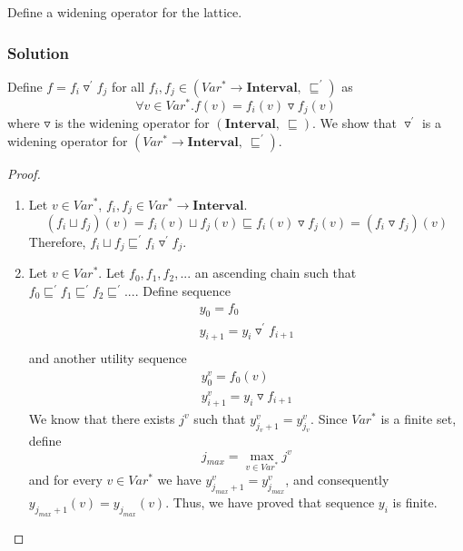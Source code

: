 Define a widening operator for the lattice.

\subsubsection*{Solution}
Define $f=f_i\triangledown^\prime f_j$ for all $f_i,f_j\in (Var^* \rightarrow \mathbf{Interval},\ \sqsubseteq^\prime)$ as
\begin{equation*}
\forall v\in Var^*.f(v)=f_i(v)\triangledown f_j(v)
\end{equation*}
where $\triangledown$ is the widening operator for $(\mathbf{Interval},\ \sqsubseteq)$. We show that $\triangledown^\prime$ is a widening operator for $(Var^* \rightarrow \mathbf{Interval},\ \sqsubseteq^\prime)$.
\begin{proof}
	\begin{enumerate}
	\item Let $v\in Var^*$, $f_i,f_j\in Var^* \rightarrow \mathbf{Interval}$.\\
	\begin{equation*}
	(f_i\sqcup f_j)(v)=f_i(v)\sqcup f_j(v)\sqsubseteq f_i(v)\triangledown f_j(v)=(f_i\triangledown f_j)(v)
	\end{equation*}
	Therefore, $f_i\sqcup f_j\sqsubseteq^\prime f_i\triangledown^\prime f_j$.
	\item Let $v\in Var^*$. Let $f_0,f_1,f_2,...$ an ascending chain such that $f_0\sqsubseteq^\prime f_1\sqsubseteq^\prime f_2\sqsubseteq^\prime...$. Define sequence
	\begin{align*}
	y_0=f_0 \\
	y_{i+1}=y_i\triangledown^\prime f_{i+1}\\
	\end{align*}
	and another utility sequence
	\begin{align*}
	y_0^v=f_0(v) \\
	y_{i+1}^v=y_i\triangledown f_{i+1}
	\end{align*}
	We know that there exists $j^v$ such that $y_{j_v+1}^v=y_{j_v}^v$. Since $Var^*$ is a finite set, define
	\begin{equation*}
	j_{max}=\max\limits_{v\in Var^*}j^v
	\end{equation*}
	and for every $v\in Var^*$ we have $y_{j_{max}+1}^v=y_{j_{max}}^v$, and consequently $y_{j_{max}+1}(v)=y_{j_{max}}(v)$. Thus, we have proved that sequence $y_i$ is finite.
	\end{enumerate}
\end{proof}